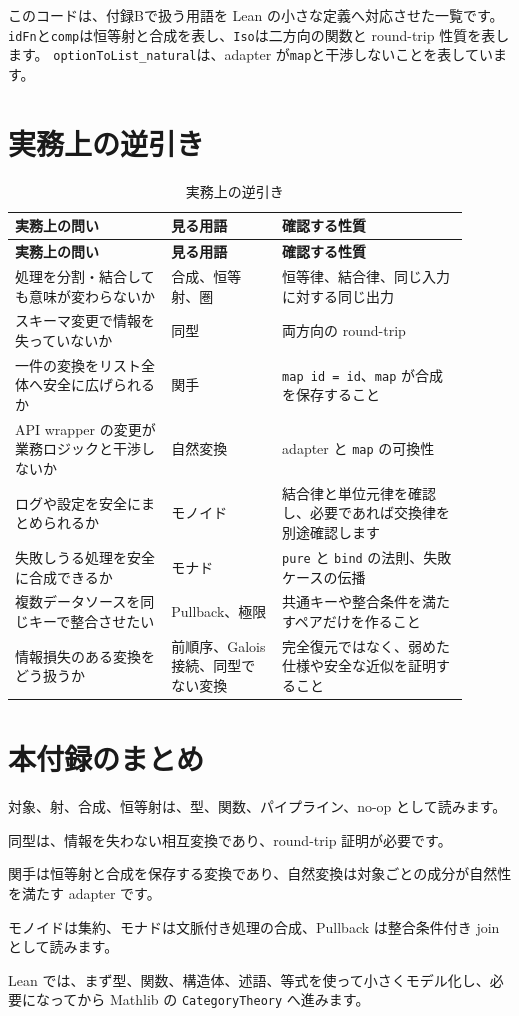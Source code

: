 このコードは、付録Bで扱う用語を Lean の小さな定義へ対応させた一覧です。
\texttt{idFn}と\texttt{comp}は恒等射と合成を表し、\texttt{Iso}は二方向の関数と round-trip 性質を表します。
\texttt{optionToList\_natural}は、adapter が\texttt{map}と干渉しないことを表しています。

\section{実務上の逆引き}

\begingroup
\small
\setlength{\tabcolsep}{4pt}
\begin{longtable}{@{}p{0.31\linewidth}p{0.22\linewidth}p{0.37\linewidth}@{}}
\caption{実務上の逆引き}\label{tab:appB-reverse-lookup}\\
\toprule
\textbf{実務上の問い} & \textbf{見る用語} & \textbf{確認する性質} \\
\midrule
\endfirsthead
\toprule
\textbf{実務上の問い} & \textbf{見る用語} & \textbf{確認する性質} \\
\midrule
\endhead
処理を分割・結合しても意味が変わらないか & 合成、恒等射、圏 & 恒等律、結合律、同じ入力に対する同じ出力 \\
スキーマ変更で情報を失っていないか & 同型 & 両方向の round-trip \\
一件の変換をリスト全体へ安全に広げられるか & 関手 & \texttt{map id = id}、\texttt{map} が合成を保存すること \\
API wrapper の変更が業務ロジックと干渉しないか & 自然変換 & adapter と \texttt{map} の可換性 \\
ログや設定を安全にまとめられるか & モノイド & 結合律と単位元律を確認し、必要であれば交換律を別途確認します \\
失敗しうる処理を安全に合成できるか & モナド & \texttt{pure} と \texttt{bind} の法則、失敗ケースの伝播 \\
複数データソースを同じキーで整合させたい & Pullback、極限 & 共通キーや整合条件を満たすペアだけを作ること \\
情報損失のある変換をどう扱うか & 前順序、Galois 接続、同型でない変換 & 完全復元ではなく、弱めた仕様や安全な近似を証明すること \\
\bottomrule
\end{longtable}
\endgroup

\section{本付録のまとめ}

対象、射、合成、恒等射は、型、関数、パイプライン、no-op として読みます。

同型は、情報を失わない相互変換であり、round-trip 証明が必要です。

関手は恒等射と合成を保存する変換であり、自然変換は対象ごとの成分が自然性を満たす adapter です。

モノイドは集約、モナドは文脈付き処理の合成、Pullback は整合条件付き join として読みます。

Lean では、まず型、関数、構造体、述語、等式を使って小さくモデル化し、必要になってから Mathlib の \texttt{CategoryTheory} へ進みます。
